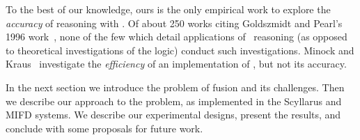 To the best of our knowledge, ours is the only empirical work to explore the
\emph{accuracy} of reasoning with \zplus.
Of about 250 works citing Goldszmidt and Pearl's 1996
work~\cite{google-scholar-query}, none of the few which detail
applications of \zplus\ reasoning (as opposed to theoretical investigations of
the logic) conduct such investigations.
%
Minock and Kraus~ investigate the
\emph{efficiency} of an implementation of \zplus,
but not its accuracy.
%
%

In the next section we introduce the problem of \ids fusion
and its challenges.  Then we describe our approach to the
problem, as implemented in the Scyllarus and MIFD systems.  We describe our
experimental designs, present the results, and conclude with some proposals for
future work.

